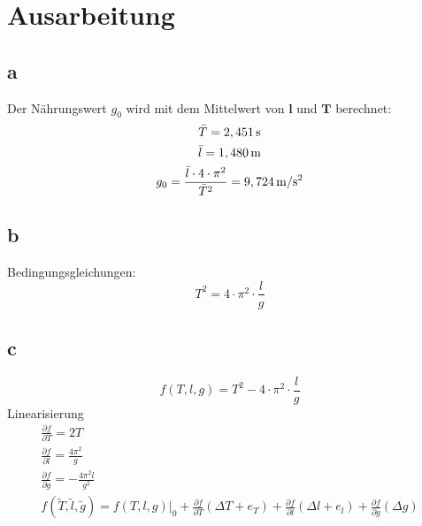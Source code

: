 \chapter{Ausarbeitung}
\section{a}
Der Nährungswert $g_0$ wird mit dem Mittelwert von $\bm{l}$ und $\bm{T}$ berechnet:
\begin{gather*}
	\bar{T} = 2,451 \,\mathrm{s} \\
	\bar{l} = 1,480 \,\mathrm{m} \\
	g_0 = \frac{\bar{l} \cdot 4 \cdot \pi^2}{\bar{T}^2} = 9,724 \,\mathrm{m/s^2}
\end{gather*}
\section{b}
Bedingungsgleichungen:
\begin{equation*}
	T^2 = 4 \cdot \pi^2 \cdot \frac{l}{g}
\end{equation*}
\section{c}
\begin{equation*}
	f(T,l,g) = T^2 - 4 \cdot \pi^2 \cdot \frac{l}{g}
\end{equation*}
Linearisierung
\begin{gather*}
	\frac{\partial f}{\partial T} = 2T \\
	\frac{\partial f}{\partial l} = \frac{4 \pi^2}{g} \\
	\frac{\partial f}{\partial g} = - \frac{4 \pi^2 l}{g^2} \\
	f(\tilde{T},\tilde{l},\tilde{g}) = f(T,l,g)|_0 + \frac{\partial f}{\partial T}(\Delta T + e_T) + \frac{\partial f}{\partial l}(\Delta l + e_l) + \frac{\partial f}{\partial g}(\Delta g)
\end{gather*}
